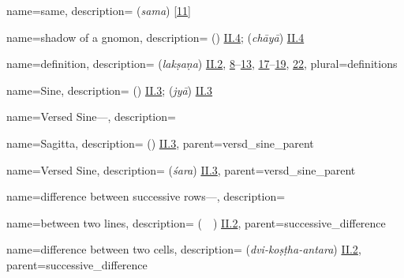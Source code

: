 {
        name={same},
        description={ (\textit{sama}) [\hyperlink{SEpass11}{11}]}
}


{
        name={shadow of a gnomon},
        description={ (\zill) \hyperlink{Pii4}{II.4};   (\textit{chāyā}) \hyperlink{Sii4}{II.4}}
}

{
        name={definition},
        description={ (\textit{lakṣaṇa}) \hyperlink{Sii2}{II.2}, \hyperlink{Sii8}{8}--\hyperlink{Sii13}{13}, \hyperlink{Sii17}{17}--\hyperlink{Sii19}{19}, \hyperlink{Sii22}{22}},
        plural={definitions}
}


{
        name={Sine},
        description={ (\jayb) \hyperlink{Pii3}{II.3};  (\textit{jyā}) \hyperlink{Sii3}{II.3}}
}

{
        name={Versed Sine---},
        description={\phantom{x}\nopagebreak}
}

{
        name={Sagitta},
        description={ (\sahm) \hyperlink{Pii3}{II.3}},
        parent={versd_sine_parent}
} 

{
        name={Versed Sine},
        description={ (\textit{śara}) \hyperlink{Sii3}{II.3}},
        parent={versd_sine_parent}
}


{
        name={difference between successive rows---},
        description={\phantom{x}\nopagebreak}
}
  
{
        name={between two lines},
        description={ (\ma\ \bayn\ \alsatrayn) \hyperlink{Pii2}{II.2}},
        parent={successive_difference}
}

{
        name={difference between two cells},
        description={ (\textit{dvi-koṣṭha-antara}) \hyperlink{Sii2}{II.2}},
        parent={successive_difference}
}        

